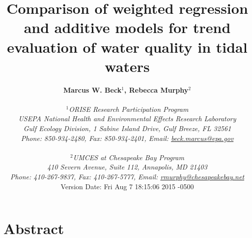 \documentclass[letterpaper,12pt,oneside]{article}\usepackage[]{graphicx}\usepackage[]{color}
\begin{document}
\raggedbottom
\raggedright
{}
\setlength{\parindent}{0.5in}
\renewcommand\refname{References \vspace{12pt}}

\begin{singlespace}
\title{{\bf {\Large Comparison of weighted regression and additive models for trend evaluation of water quality in tidal waters}}}
\author{
  {\bf {\normalsize Marcus W. Beck$^1$, Rebecca Murphy$^2$}}
  \\\\{\textit {\normalsize $^1$ORISE Research Participation Program}}
  \\{\textit {\normalsize USEPA National Health and Environmental Effects Research Laboratory}}
  \\{\textit {\normalsize Gulf Ecology Division, 1 Sabine Island Drive, Gulf Breeze, FL 32561}}
	\\{\textit {\normalsize Phone: 850-934-2480, Fax: 850-934-2401, Email: \href{mailto:beck.marcus@epa.gov}{beck.marcus@epa.gov}}}
  \\\\{\textit {\normalsize $^2$UMCES at Chesapeake Bay Program}}
	\\{\textit {\normalsize 410 Severn Avenue, Suite 112, Annapolis, MD 21403}}
	\\{\textit {\normalsize Phone: 410-267-9837, Fax: 410-267-5777, Email: \href{mailto:rmurphy@chesapeakbay.net}{rmurphy@chesapeakebay.net}}}
  \vspace{1in} 
  \\ Version Date:   Fri Aug 7 18:15:06 2015 -0500
	}
\date{}
\maketitle
\end{singlespace}
\clearpage

\section*{Abstract}
\end{document}
